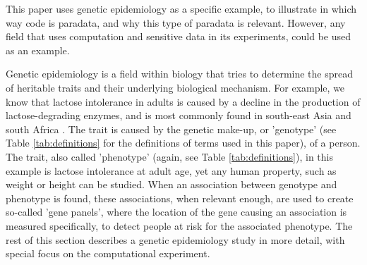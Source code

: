 
This paper uses genetic epidemiology as a specific example,
to illustrate in which way code is paradata,
and why this type of paradata is relevant.
However, any field that uses computation 
and sensitive data in its experiments,
could be used as an example.


Genetic epidemiology is a field within biology that
tries to determine the spread of heritable traits 
and their underlying biological mechanism.
For example, we know that lactose intolerance in adults is
caused by a decline in the production of lactose-degrading enzymes,
and is most commonly found in south-east Asia and south Africa \cite{storhaug2017country}.
The trait is caused by the genetic make-up, or 'genotype'
(see Table \ref{tab:definitions} for the definitions of terms used in this paper), 
of a person.
The trait, also called 'phenotype' (again, see Table \ref{tab:definitions}), 
in this example is lactose intolerance at adult age,
yet any human property, such as weight or height can be studied.
When an association between genotype and phenotype is found,
these associations, when relevant enough, are used to 
create so-called 'gene panels', 
where the location of the gene causing 
an association is measured specifically, 
to detect people at risk for the associated phenotype.
The rest of this section describes a genetic epidemiology study 
in more detail, with special focus on the computational experiment.

